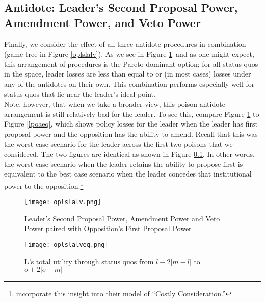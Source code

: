 \documentclass[12pt]{article}
\theoremstyle{plain}		      \newtheorem{assn}{Assumption}
\theoremstyle{plain}		      \newtheorem{prop}{Proposition}
\theoremstyle{plain}		      \newtheorem{lemma}{Lemma}
\theoremstyle{plain}	          \newtheorem{imp}{Implication}
\theoremstyle{plain}	          \newtheorem{hyp}{Hypothesis}
\theoremstyle{definition}		  \newtheorem{defn}{Definition}
\theoremstyle{remark}	          \newtheorem{rem}{Remark}
\theoremstyle{definition}         \newtheorem{case}{Case}
\begin{document}
\subsection{Antidote: Leader's Second Proposal Power, Amendment Power, and  Veto Power}
\indent Finally, we consider the effect of all three antidote procedures in combination (game tree in Figure \ref{oplslalv}). As we see in Figure \ref{oplslalveq}\, and as one might expect, this arrangement of procedures is the Pareto dominant option; for all status quos in the space, leader losses are less than equal to or (in most cases) losses under any of the antidotes on their own. This combination performs especially well for status quos that lie near the leader's ideal point. 
\\
\indent Note, however, that when we take a broader view, this poison-antidote arrangement is still relatively bad for the leader. To see this, compare Figure \ref{oplslalveq} to Figure \ref{lpoaeq}, which shows policy losses for the leader when the leader has first proposal power and the opposition has the ability to amend. Recall that this was the worst case scenario for the leader across the first two poisons that we considered. The two figures are identical as shown in Figure \ref{}. In other words, the worst case scenario when the leader retains the ability to propose first is equivalent to the best case scenario when the leader concedes that institutional power to the opposition.\footnote{\citet{hartogmonroe11} incorporate this insight into their model of ``Costly Consideration.''}
\begin{figure}[h]
  \centering
  \begin{minipage}[b]{0.3\textwidth}
    \texttt{[image: oplslalv.png]}
    \caption{Leader's Second Proposal Power, Amendment Power and Veto Power paired with Opposition's First Proposal Power}
    \label{oplslalv}
  \end{minipage}
  \hfill
  \begin{minipage}[b]{0.6\textwidth}
    \texttt{[image: oplslalveq.png]}
    \caption{L's total utility through status quos from \newline $l-2|m-l|$ to $o+2|o-m|$}
    \label{oplslalveq}
  \end{minipage}
\end{figure}
\FloatBarrier

\end{document}
